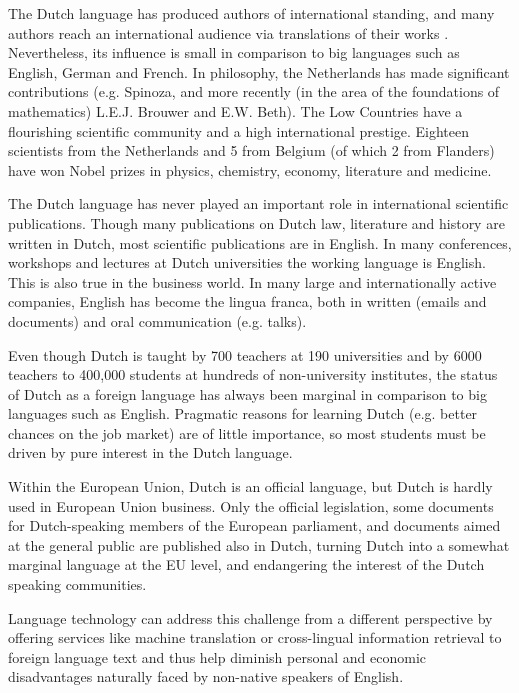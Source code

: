 \documentclass[]{../../metanetpaper}
\begin{document}
\begin{multicols}{2}
    The Dutch language has produced authors of international standing, and many authors reach an international audience via translations of their works \cite{Vertalingendb}.   Nevertheless, its influence is small in comparison to big languages such as English, German and French. In philosophy, the Netherlands has made significant contributions (e.g. Spinoza, and more recently (in the area of the foundations of mathematics) L.E.J. Brouwer and E.W. Beth). The Low Countries have a flourishing scientific community and a high international prestige.  Eighteen scientists from the Netherlands and 5 from Belgium (of which 2 from Flanders) have won Nobel prizes in physics, chemistry, economy, literature and medicine.

    The Dutch language has never played an important role in international scientific publications. Though many publications on Dutch law, literature and history are written in Dutch, most scientific publications are in English. In many conferences, workshops and lectures at Dutch universities the working language is English. This is also true in the business world. In many large and internationally active companies, English has become the lingua franca, both in written (emails and documents) and oral communication (e.g. talks).


    Even though Dutch is taught by 700 teachers at 190 universities and by 6000 teachers to 400,000 students at hundreds of non-university institutes, the status of Dutch as a foreign language has always been marginal in comparison to big languages such as English. Pragmatic reasons for learning Dutch (e.g. better chances on the job market) are of little importance, so most students must be driven by pure interest in the Dutch language.

    Within the European Union, Dutch is an official language, but Dutch is hardly used in European Union business. Only the official legislation, some documents for Dutch-speaking members of the European parliament, and documents aimed at the general public are published also in Dutch, turning Dutch into a somewhat marginal language at the EU level, and endangering the interest of the Dutch speaking communities.

    Language technology can address this challenge from a different perspective by offering services like machine translation or cross-lingual information retrieval to foreign language text and thus help diminish personal and economic disadvantages naturally faced by non-native speakers of English.


\end{multicols}
\end{document}
